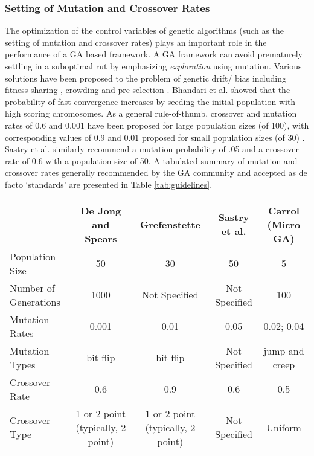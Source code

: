 \documentclass[journal]{IEEEtran}
\begin{document}
\vspace{2mm}
\subsubsection{Setting of Mutation and Crossover Rates}

The optimization of the control variables of genetic algorithms (such as the setting of mutation and crossover rates) plays an important role in the performance of a GA based framework. A GA framework can avoid prematurely settling in a suboptimal rut by emphasizing \emph{exploration} using mutation.  Various solutions have been proposed to the problem of genetic drift/ bias including fitness sharing \cite{fonseca1995multiobjective}, crowding and pre-selection \cite{mahfoud1992crowding}. Bhandari et al. \cite{bhandari1996genetic} showed that the probability of fast convergence increases by seeding the initial population with high scoring chromosomes. As a general rule-of-thumb, crossover and mutation rates of 0.6 and 0.001 have been proposed for large population sizes (of 100), with corresponding values of 0.9 and 0.01 proposed for small population sizes (of 30) \cite{grefenstette1986optimization} \cite{de1991analysis}. Sastry et al. \cite{sastry2005genetic} similarly recommend a mutation probability of .05 and a crossover rate of 0.6 with a population size of 50. A tabulated summary of mutation and crossover rates generally recommended by the GA community and accepted as de facto `standards' are presented in Table \ref{tab:guidelines}.

\begin{table*}
\caption{Summary of GA paramater settings guidelines generally accepted by the GA community}
\centering
\begin{tabular}{p{3cm}cccc}
\toprule
 & \textbf{De Jong and Spears \cite{de1991analysis}} & \textbf{Grefenstette \cite{grefenstette1986optimization}} & \textbf{Sastry et al. \cite{sastry2005genetic}} & \textbf{ Carrol \cite{carroll1996chemical} (Micro GA)} \\
\midrule
    Population Size & 50 & 30 & 50 & 5  \\
    Number of Generations & 1000 & Not Specified & Not Specified & 100 \\
    Mutation Rates  & 0.001  & 0.01  & 0.05  & 0.02; 0.04 \\
    Mutation Types  & bit flip & bit flip  & Not Specified & jump and creep\\
	Crossover Rate  & 0.6 & 0.9  & 0.6 & 0.5\\
    Crossover Type  & 1 or 2 point (typically, 2 point)  & 1 or 2 point  (typically, 2 point) & Not Specified & Uniform\\
   
\bottomrule
 \end{tabular}
\label{tab:guidelines}
\end{table*}
\end{document}
